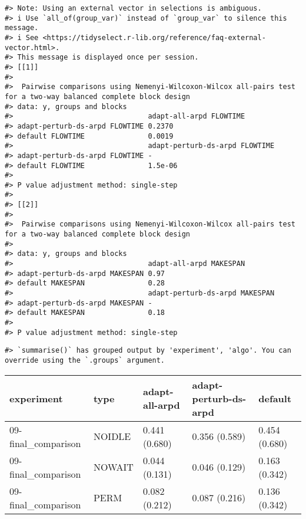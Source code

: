 \documentclass[
]{article}
\begin{document}
\begin{verbatim}
#> Note: Using an external vector in selections is ambiguous.
#> i Use `all_of(group_var)` instead of `group_var` to silence this message.
#> i See <https://tidyselect.r-lib.org/reference/faq-external-vector.html>.
#> This message is displayed once per session.
#> [[1]]
#> 
#>  Pairwise comparisons using Nemenyi-Wilcoxon-Wilcox all-pairs test for a two-way balanced complete block design
#> data: y, groups and blocks
#>                                adapt-all-arpd FLOWTIME
#> adapt-perturb-ds-arpd FLOWTIME 0.2370                 
#> default FLOWTIME               0.0019                 
#>                                adapt-perturb-ds-arpd FLOWTIME
#> adapt-perturb-ds-arpd FLOWTIME -                             
#> default FLOWTIME               1.5e-06
#> 
#> P value adjustment method: single-step
#> 
#> [[2]]
#> 
#>  Pairwise comparisons using Nemenyi-Wilcoxon-Wilcox all-pairs test for a two-way balanced complete block design
#> 
#> data: y, groups and blocks
#>                                adapt-all-arpd MAKESPAN
#> adapt-perturb-ds-arpd MAKESPAN 0.97                   
#> default MAKESPAN               0.28                   
#>                                adapt-perturb-ds-arpd MAKESPAN
#> adapt-perturb-ds-arpd MAKESPAN -                             
#> default MAKESPAN               0.18
#> 
#> P value adjustment method: single-step
\end{verbatim}

\begin{verbatim}
#> `summarise()` has grouped output by 'experiment', 'algo'. You can override using the `.groups` argument.
\end{verbatim}

\begin{longtable}[]{@{}lllll@{}}
\toprule
experiment & type & adapt-all-arpd & adapt-perturb-ds-arpd & default \\
\midrule
\endhead
09-final\_comparison & NOIDLE & 0.441 (0.680) & 0.356 (0.589) & 0.454
(0.680) \\
09-final\_comparison & NOWAIT & 0.044 (0.131) & 0.046 (0.129) & 0.163
(0.342) \\
09-final\_comparison & PERM & 0.082 (0.212) & 0.087 (0.216) & 0.136
(0.342) \\
\bottomrule
\end{longtable}
\end{document}
